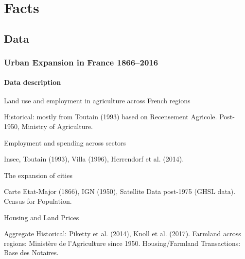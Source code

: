 \documentclass[aspectratio=169]{beamer}
\begin{document}
\begin{v75mins}

\end{v75mins}


\section{Facts}
\subsection{Data}
\begin{frame}
\frametitle{Urban Expansion in France 1866--2016}
\framesubtitle{Data description}
\bi
\item Land use and employment in agriculture across French regions
\bi\item Historical: mostly from Toutain (1993) based on Recensement Agricole. Post-1950, Ministry of Agriculture. \ei
\bigskip
\item Employment and spending across sectors
\bi\item Insee, Toutain (1993), Villa (1996), Herrendorf et al. (2014).\ei
\bigskip
\item The expansion of cities
\bi\item Carte Etat-Major (1866), IGN (1950), Satellite Data post-1975 (GHSL data). Census for Population.
\ei
\bigskip
\item Housing and Land Prices \greenie{[in progress]}
\bi\item Aggregate Historical: Piketty et al. (2014), Knoll et al. (2017). Farmland across regions: Ministère de l'Agriculture since 1950. Housing/Farmland Transactions: Base des Notaires.
\ei
\ei
\end{frame}
\end{document}
